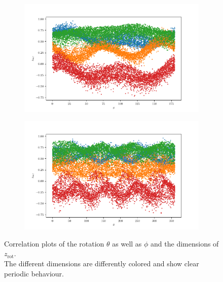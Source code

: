 \documentclass[10pt,a4paper]{article}
\newcommand{\rot}{\ensuremath{\text{rot}\xspace}}
\begin{document}
\begin{figure}[!ht]
\centering
\begin{subfigure}{0.49\textwidth}
	\centering
	\includegraphics[width=\textwidth] {cube_rot_phi_z_all.pdf}
	\caption{}
	\label{fig_rotph_all}
\end{subfigure}
\begin{subfigure}{0.49\textwidth}
	\centering	
	\includegraphics[width=\textwidth]{cube_rot_theta_z_all.pdf}
	\caption{}
	\label{fig_rotth_all}
\end{subfigure}
\caption{Correlation plots of the rotation $\theta$ as well as $\phi$ and the dimensions of $z_{\rot}$.\\
The different dimensions are differently colored and show clear periodic behaviour.} \label{cube_corr_rot}
\end{figure}


\newpage
\end{document}
